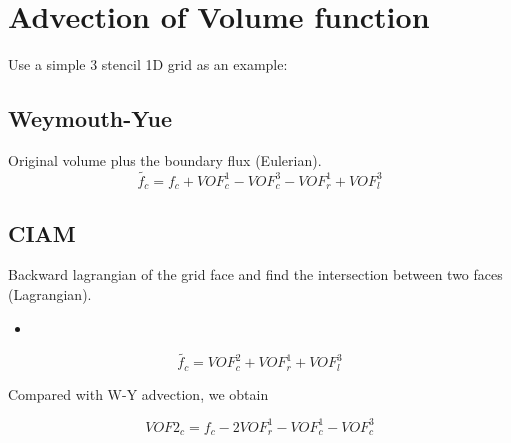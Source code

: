 \documentclass{article}
\begin{document}
\section{Advection of Volume function}
Use a simple 3 stencil 1D grid as an example:



\subsection{Weymouth-Yue}
Original volume plus the boundary flux (Eulerian).
\begin{equation}
  \label{eq:wy}
  \tilde{f_{c}} = f_{c} + VOF^{1}_{c} - VOF^{3}_{c} - VOF^{1}_{r} + VOF^{3}_{l}
\end{equation}

\subsection{CIAM}
Backward lagrangian of the grid face and find the intersection between
two faces (Lagrangian).

\begin{itemize}
  \item 
\end{itemize}

\begin{equation}
  \label{eq:CIAM}
  \tilde{f_{c}} = VOF^{2}_{c} + VOF^{1}_{r} + VOF^{3}_{l}
\end{equation}

Compared with W-Y advection, we obtain

\begin{equation}
  \label{eq:CIAM}
  VOF2_{c} = f_{c} - 2 VOF^{1}_{r} - VOF^{1}_{c} - VOF^{3}_{c}
\end{equation}
\end{document}
